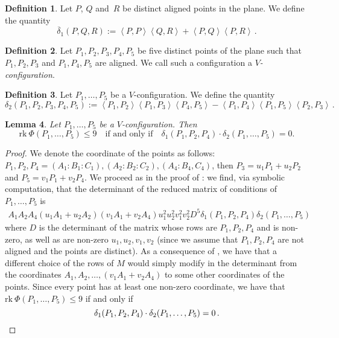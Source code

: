 \documentclass[11pt, a4paper, reqno, captions=tableheading,bibliography=totoc]{scrartcl}
\theoremstyle{plain}
\newtheorem{lemma}{Lemma}[section]
\theoremstyle{definition}
\newtheorem{definition}[lemma]{Definition}
\newcommand{\scl}[2]{\left\langle {#1}, {#2} \right\rangle}
\begin{document}
\begin{definition}
\label{definition:delta1b}
 Let $P$, $Q$ and~$R$ be distinct aligned points in the plane.
 We define the quantity
 \[
  \overline{\delta}_1(P, Q, R) :=
  \scl{P}{P} \scl{Q}{R} + \scl{P}{Q}\scl{P}{R} \,.
  \]
\end{definition}

\begin{definition}
\label{Vconf}
Let $P_1, P_2, P_3, P_4, P_5$ be five distinct points of the plane
such that $P_1, P_2, P_3$ and $P_1, P_4, P_5$ are aligned.
We call such a configuration a \emph{$V$-configuration}.
\end{definition}


\begin{definition}
 Let $P_1, \dots, P_5$ be a $V$-configuration.
We define the quantity
 \[
  \delta_2(P_1, P_2, P_3, P_4, P_5) :=
  \scl{P_1}{P_2} \scl{P_1}{P_3} \scl{P_4}{P_5} -
  \scl{P_1}{P_4} \scl{P_1}{P_5} \scl{P_2}{P_3} \,.
 \]
\end{definition}

\begin{lemma}
\label{lemma:d1d2}
Let $P_1, \dots, P_5$ be a $V$-configuration. Then
\[
\text{rk}\ \Phi(P_1, \dots, P_5) \leq 9
\quad \mbox{
if and only if} \quad
\delta_1(P_1, P_2, P_4) \cdot \delta_2(P_1, \dots, P_5) = 0.
\]
\end{lemma}
\begin{proof}
We denote the coordinate of the points as follows:
$P_1, P_2, P_4 = (A_1: B_1: C_1), (A_2: B_2: C_2), (A_4: B_4, C_4)$,
then $P_3 = u_1P_1+u_2P_2$ and $P_5 = v_1P_1+v_2P_4$. We proceed as in
the proof of : we find, via symbolic computation, that the determinant of
the reduced matrix of conditions of $P_1, \dotsc, P_5$ is
%
\begin{gather}
\label{delta1delta2}
A_1A_2A_4(u_1A_1+u_2A_2)(v_1A_1+v_2A_4)u_1^2u_2^2v_1^2v_2^2D^5
\delta_1(P_1,P_2,P_4)\delta_2(P_1,\dots,P_5)
\end{gather}
%
where $D$ is the determinant of the matrix whose rows are $P_1, P_2, P_4$
and is non-zero, as well as are non-zero $u_1, u_2, v_1, v_2$ (since we
assume that $P_1, P_2, P_4$ are not aligned and the points are distinct).
As a consequence of , we have that a different
choice of the rows of $M$ would simply modify in the
determinant from  the coordinates
$A_1, A_2, \dots, (v_1A_1+v_2A_4)$ to some other coordinates of the points.
Since every point has at least one non-zero coordinate, we have that
$\text{rk}\ \Phi(P_1, \dots, P_5) \leq 9$ if and only if
\[
\delta_1(P_1, P_2, P_4) \cdot \delta_2(P_1, \dots, P_5) = 0 \,. \qedhere
\]
\end{proof}
\end{document}
